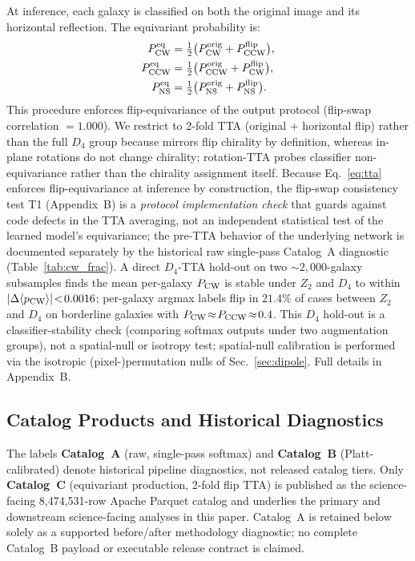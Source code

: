 \documentclass[twocolumn,linenumbers]{aastex702}
\newcommand{\pcw}{P_{\rm CW}}
\newcommand{\pccw}{P_{\rm CCW}}
\newcommand{\pns}{P_{\rm NS}}
\begin{document}
At inference, each galaxy is classified on both the original image and its horizontal reflection. The equivariant probability is:
\begin{align}
\pcw^{\rm eq} &= \tfrac{1}{2}\bigl(\pcw^{\rm orig} + \pccw^{\rm flip}\bigr), \nonumber \\
\pccw^{\rm eq} &= \tfrac{1}{2}\bigl(\pccw^{\rm orig} + \pcw^{\rm flip}\bigr), \label{eq:tta} \\
\pns^{\rm eq} &= \tfrac{1}{2}\bigl(\pns^{\rm orig} + \pns^{\rm flip}\bigr). \nonumber
\end{align}
This procedure enforces flip-equivariance of the output protocol (flip-swap correlation $= 1.000$). We restrict to 2-fold TTA (original + horizontal flip) rather than the full $D_4$ group because mirrors flip chirality by definition, whereas in-plane rotations do not change chirality; rotation-TTA probes classifier non-equivariance rather than the chirality assignment itself. Because Eq.~\eqref{eq:tta} enforces flip-equivariance at inference by construction, the flip-swap consistency test T1 (Appendix~B) is a \emph{protocol implementation check} that guards against code defects in the TTA averaging, not an independent statistical test of the learned model's equivariance; the pre-TTA behavior of the underlying network is documented separately by the historical raw single-pass Catalog~A diagnostic (Table~\ref{tab:cw_frac}). A direct $D_4$-TTA hold-out on two $\sim\!2{,}000$-galaxy subsamples finds the mean per-galaxy $\pcw$ is stable under $Z_2$ and $D_4$ to within $|\Delta\langle p_{\rm CW}\rangle|\!<\!0.0016$; per-galaxy argmax labels flip in $21.4\%$ of cases between $Z_2$ and $D_4$ on borderline galaxies with $\pcw\!\approx\!\pccw\!\approx\!0.4$. This $D_4$ hold-out is a classifier-stability check (comparing softmax outputs under two augmentation groups), not a spatial-null or isotropy test; spatial-null calibration is performed via the isotropic (pixel-)permutation nulls of Sec.~\ref{sec:dipole}. Full details in Appendix~B.

\subsection{Catalog Products and Historical Diagnostics}
\label{sec:tiers}

The labels \textbf{Catalog~A} (raw, single-pass softmax) and \textbf{Catalog~B} (Platt-calibrated) denote historical pipeline diagnostics, not released catalog tiers. Only \textbf{Catalog~C} (equivariant production, 2-fold flip TTA) is published as the science-facing 8,474,531-row Apache Parquet catalog and underlies the primary and downstream science-facing analyses in this paper. Catalog~A is retained below solely as a supported before/after methodology diagnostic; no complete Catalog~B payload or executable release contract is claimed.
\end{document}
